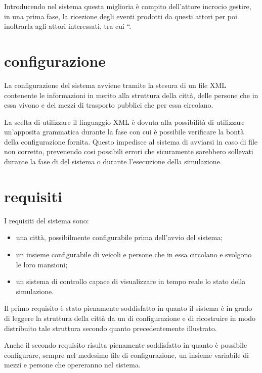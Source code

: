 Introducendo nel sistema questa miglioria è compito dell'attore incrocio gestire, in una prima fase, la ricezione degli eventi prodotti da questi attori per poi inoltrarla agli attori interessati, tra cui ``.

\section*{configurazione}
\label{soluzione-proposta-configurazione}
La configurazione del sistema avviene tramite la stesura di un file XML contenente le informazioni in merito alla struttura della città, delle persone che in essa vivono e dei mezzi di trasporto pubblici che per essa circolano.

La scelta di utilizzare il linguaggio XML è dovuta alla possibilità di utilizzare un'apposita grammatica durante la fase  con cui è possibile verificare la bontà della configurazione fornita. Questo impedisce al sistema di avviarsi in caso di file non corretto, prevenendo cosi possibili errori che sicuramente sarebbero sollevati durante la fase di  del sistema o durante l'esecuzione della simulazione.

\section*{requisiti}
\label{soluzione-proposta-requisiti}
I requisiti del sistema sono:

\begin{itemize}
\item{una città, possibilmente configurabile prima dell'avvio del sistema;}
\item{un insieme configurabile di veicoli e persone che in essa circolano e svolgono le loro mansioni;}
\item{un sistema di controllo capace di visualizzare in tempo reale lo stato della simulazione.}
\end{itemize}

Il primo requisito è stato pienamente soddisfatto in quanto il sistema è in grado di leggere la struttura della città da un  di configurazione e di ricostruire in modo distribuito tale struttura secondo quanto precedentemente illustrato.

Anche il secondo requisito risulta pienamente soddisfatto in quanto è possibile configurare, sempre nel medesimo file di configurazione, un insieme variabile di mezzi e persone che opereranno nel sistema.

